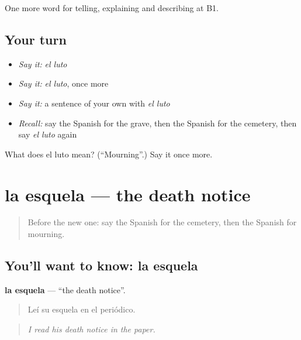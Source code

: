\begin{grammarlens}[title={What you've built}]
One more word for telling, explaining and describing at B1.
\end{grammarlens}

\subsection*{Your turn}
\begin{itemize}
\raggedright
  \item \emph{Say it:} \emph{el luto}
  \item \emph{Say it:} \emph{el luto}, once more
  \item \emph{Say it:} a sentence of your own with \emph{el luto}
  \item \emph{Recall:} say the Spanish for the grave, then the Spanish for the cemetery, then say \emph{el luto} again
\end{itemize}

\begin{tcolorbox}[breakable,colback=teal!4,colframe=teal!35!black,title={Before you move on}]
What does el luto mean? (\textquotedblleft{}Mourning\textquotedblright{}.) Say it once more.
\end{tcolorbox}
\section[la esquela]{la esquela — the death notice}

\label{lesson:ES-C557-esquela}



\begin{quote}
Before the new one: say the Spanish for the cemetery, then the Spanish for mourning.
\end{quote}

\subsection*{You'll want to know: la esquela}
\textbf{la esquela} — \textquotedblleft{}the death notice\textquotedblright{}.

\begin{quote}
Leí su esquela en el periódico.
\end{quote}

\begin{quote}
\emph{I read his death notice in the paper.}
\end{quote}

